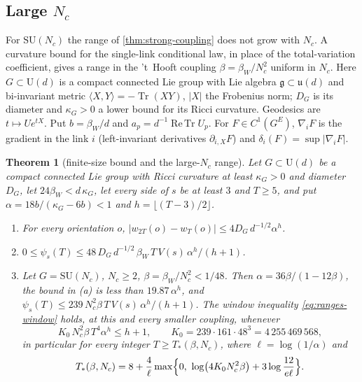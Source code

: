 \documentclass[11pt,a4paper]{amsart}
\newtheorem{theorem}{Theorem}[section]
\theoremstyle{definition}
\theoremstyle{remark}
\numberwithin{equation}{section}
\DeclareMathOperator{\Tr}{Tr}        %
\DeclareMathOperator{\ReTr}{Re\,Tr}  %
\newcommand{\ip}[2]{\langle #1,#2\rangle}  %
\newcommand{\abs}[1]{\lvert #1\rvert}      %
\newcommand{\SU}{\mathrm{SU}}              %
\newcommand{\U}{\mathrm{U}}                %
\newcommand{\psiT}[2]{\psi_{#1}(#2)}       %
\newcommand{\Vol}[1]{V(#1)}                %
\newcommand{\betaW}{\beta_{W}}             %
\begin{document}
\subsection{Large $N_c$}

For $\SU(N_c)$ the range of \cref{thm:strong-coupling} does not grow with $N_c$. A curvature bound for the single-link conditional law, in place of the total-variation coefficient, gives a range in the 't~Hooft coupling $\beta=\betaW/N_c^2$ uniform in $N_c$. Here $G\subset\U(d)$ is a compact connected Lie group with Lie algebra $\mathfrak g\subset\mathfrak u(d)$ and bi-invariant metric $\ip{X}{Y}=-\Tr(XY)$, $\abs{X}$ the Frobenius norm; $D_G$ is its diameter and $\kappa_G>0$ a lower bound for its Ricci curvature. Geodesics are $t\mapsto Ue^{tX}$. Put $b=\betaW/d$ and $a_p=d^{-1}\ReTr U_p$. For $F\in C^1(G^{E})$, $\nabla_iF$ is the gradient in the link $i$ (left-invariant derivatives $\partial_{i,X}F$) and $\delta_i(F)=\sup\abs{\nabla_iF}$.

\begin{theorem}[finite-size bound and the large-$N_c$ range]\label{thm:large-N}
Let $G\subset\U(d)$ be a compact connected Lie group with Ricci curvature at least $\kappa_G>0$ and diameter $D_G$, let $24\betaW<d\,\kappa_G$, let every side of $s$ be at least $3$ and $T\ge5$, and put $\alpha=18b/(\kappa_G-6b)<1$ and $h=\lfloor(T-3)/2\rfloor$.
\begin{enumerate}[label=\textup{(\alph*)},leftmargin=*]
\item For every orientation $o$, $\abs{w_{2T}(o)-w_T(o)}\le4D_G\,d^{-1/2}\alpha^{h}$.
\item $0\le\psiT{s}{T}\le48\,D_G\,d^{-1/2}\,\betaW\,T\,\Vol{s}\,\alpha^{h}/(h+1)$.
\item Let $G=\SU(N_c)$, $N_c\ge2$, $\beta=\betaW/N_c^2<1/48$. Then $\alpha=36\beta/(1-12\beta)$, the bound in \textup{(a)} is less than $19.87\,\alpha^h$, and $\psiT{s}{T}\le239\,N_c^2\beta\,T\,\Vol{s}\,\alpha^h/(h+1)$. The window inequality \eqref{eq:ranges-window} holds, at this and every smaller coupling, whenever
\begin{equation}\label{eq:ln-K0}
K_0\,N_c^2\beta\,T^4\alpha^{h}\le h+1,\qquad K_0=239\cdot161\cdot48^3=4\,255\,469\,568,
\end{equation}
in particular for every integer $T\ge T_*(\beta,N_c)$, where $\ell=\log(1/\alpha)$ and
\begin{equation}\label{eq:ln-Tstar}
T_*(\beta,N_c)=8+\frac4\ell\max\Bigl\{0,\ \log\bigl(4K_0N_c^2\beta\bigr)+3\log\frac{12}{e\ell}\Bigr\}.
\end{equation}
\end{enumerate}
\end{theorem}
\end{document}
